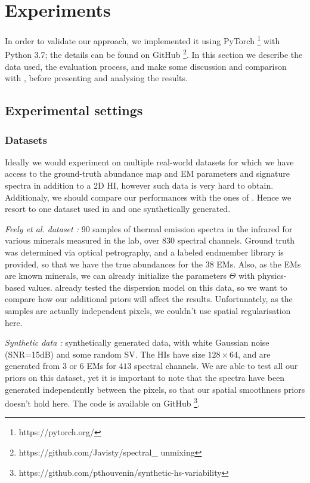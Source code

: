 \documentclass{article}
\begin{document}
\section{Experiments}
In order to validate our approach, we implemented it using \textsf{PyTorch} \footnote{https://pytorch.org/} with \textsf{Python 3.7}; the details can be found on GitHub \footnote{https://github.com/Javisty/spectral\_
unmixing}. In this section we describe the data used, the evaluation process, and make some discussion and comparison with \citet{janiczek_differentiable_2020}, before presenting and analysing the results.

\subsection{Experimental settings}
\subsubsection{Datasets}
Ideally we would experiment on multiple real-world datasets for which we have access to the ground-truth abundance map and EM parameters and signature spectra in addition to a 2D HI, however such data is very hard to obtain. Additionaly, we should compare our performances with the ones of \citet{janiczek_differentiable_2020}. Hence we resort to one dataset used in \citet{janiczek_differentiable_2020} and one synthetically generated.

\textit{Feely et al. dataset \cite{feely}:} 90 samples of thermal emission spectra in the infrared for various minerals measured in the lab, over $830$ spectral channels. Ground truth was determined via optical petrography, and a labeled endmember library is provided, so that we have the true abundances for the $38$ EMs. Also, as the EMs are known minerals, we can already initialize the parameters $\Theta$ with physics-based values. \citeauthor{janiczek_differentiable_2020} already tested the dispersion model on this data, so we want to compare how our additional priors will affect the results. Unfortunately, as the samples are actually independent pixels, we couldn't use spatial regularisation here.

\textit{Synthetic data \cite{thouvenin}:} synthetically generated data, with white Gaussian noise (SNR=15dB) and some random SV. The HIs have size $128 \times 64$, and are generated from $3$ or $6$ EMs for $413$ spectral channels. We are able to test all our priors on this dataset, yet it is important to note that the spectra have been generated independently between the pixels, so that our spatial smoothness priors doesn't hold here. The code is available on GitHub \footnote{https://github.com/pthouvenin/synthetic-hs-variability}.
\end{document}
